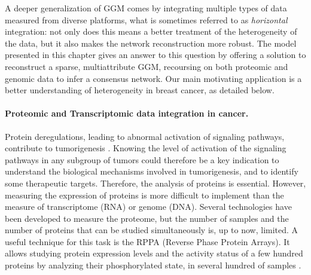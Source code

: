 A deeper generalization of GGM comes by integrating multiple types of
data measured from diverse platforms, what is sometimes referred to as
\emph{horizontal} integration: not only does this means a better
treatment of the heterogeneity of the data, but it also makes the
network reconstruction more robust. The model presented in this
chapter gives an answer to this question by offering a solution to
reconstruct a sparse, multiattribute GGM, recoursing on both proteomic
and genomic data to infer a consensus network. Our main motivating
application is a better understanding of heterogeneity in breast
cancer, as detailed below.

\paragraph*{Proteomic and Transcriptomic data integration in cancer.} 
Protein deregulations, leading to abnormal activation of signaling
pathways, contribute to tumorigenesis
\citep{giancotti2014deregulation}. Knowing the level of activation of
the signaling pathways in any subgroup of tumors could therefore be a
key indication to understand the biological mechanisms involved in
tumorigenesis, and to identify some therapeutic targets.  %
%
Therefore, the analysis of proteins is
essential.  However, measuring the expression of proteins is more
difficult to implement than the measure of transcriptome (RNA) or
genome (DNA).  Several technologies have been developed to measure the
proteome, but the number of samples and the number of proteins that
can be studied simultaneously is, up to now, limited.  A useful
technique for this task is the RPPA (Reverse Phase Protein
Arrays). It allows studying protein expression levels and the activity
status of a few hundred proteins by analyzing their phosphorylated
state, in several hundred of samples \citep{akbani2014realizing}.

